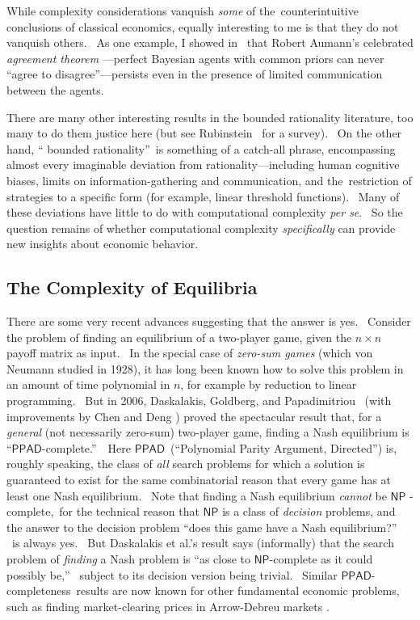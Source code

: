 \documentclass[12pt,onecolumn]{article}%
\begin{document}
While complexity considerations vanquish \textit{some} of
the\ counterintuitive conclusions of classical economics, equally interesting
to me is that they do not vanquish others. \ As one example, I showed in
\cite{aar:agr}\ that Robert Aumann's celebrated \textit{agreement theorem}
\cite{aumann}---perfect Bayesian agents with common priors can never
\textquotedblleft agree to disagree\textquotedblright---persists even in the
presence of limited communication between the agents.

There are many other interesting results in the bounded rationality
literature, too many to do them justice here (but see Rubinstein
\cite{rubinstein:book}\ for a survey). \ On the other hand, \textquotedblleft
bounded rationality\textquotedblright\ is something of a catch-all phrase,
encompassing almost every imaginable deviation from rationality---including
human cognitive biases, limits on information-gathering and communication, and
the\ restriction of strategies to a specific form (for example, linear
threshold functions). \ Many of these deviations have little to do with
computational complexity \textit{per se}. \ So the question remains of whether
computational complexity \textit{specifically} can provide new insights about
economic behavior.

\subsection{The Complexity of Equilibria\label{EQUILIB}}

There are some very recent advances suggesting that the answer is yes.
\ Consider the problem of finding an equilibrium of a two-player game, given
the $n\times n$ payoff matrix as input. \ In the special case of
\textit{zero-sum games} (which von Neumann studied in 1928), it has long been
known how to solve this problem in an amount of time polynomial in $n$, for
example by reduction to linear programming. \ But in 2006, Daskalakis,
Goldberg, and Papadimitriou \cite{dgp}\ (with improvements by Chen and Deng
\cite{chendeng}) proved the spectacular result that, for a \textit{general}
(not necessarily zero-sum) two-player game, finding a Nash equilibrium is
\textquotedblleft$\mathsf{PPAD}$-complete.\textquotedblright\ \ Here
$\mathsf{PPAD}$\ (\textquotedblleft Polynomial Parity Argument,
Directed\textquotedblright) is, roughly speaking, the class of \textit{all}
search problems for which a solution is guaranteed to exist for the same
combinatorial reason that every game has at least one Nash equilibrium. \ Note
that finding a Nash equilibrium \textit{cannot} be $\mathsf{NP}$%
-complete,\ for the technical reason that $\mathsf{NP}$ is a class of
\textit{decision }problems, and the answer to the decision problem
\textquotedblleft does this game have a Nash equilibrium?\textquotedblright%
\ is always yes. \ But Daskalakis et al.'s result says (informally) that the
search problem of \textit{finding} a Nash problem is \textquotedblleft as
close to $\mathsf{NP}$-complete as it could possibly be,\textquotedblright%
\ subject to its decision version being trivial. \ Similar $\mathsf{PPAD}%
$-completeness\ results are now known for other fundamental economic problems,
such as finding market-clearing prices in Arrow-Debreu markets \cite{cddt}.
\end{document}
